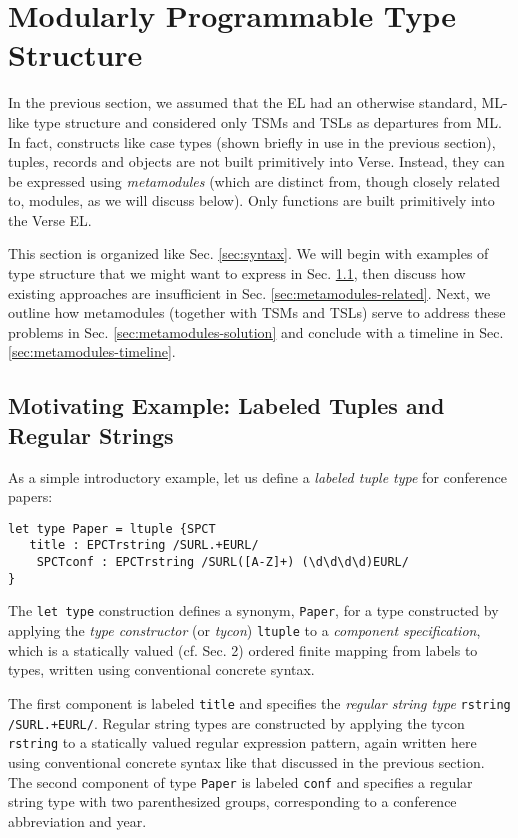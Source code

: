
\section{Modularly Programmable Type Structure}\label{sec:metamodules}
In the previous section, we assumed that the EL had an otherwise standard, ML-like type structure and considered only TSMs and TSLs as departures from ML. In fact, constructs like case types (shown briefly in use in the previous section), tuples, records and objects are not built primitively into Verse. Instead, they can be expressed using \emph{metamodules} (which are distinct from, though closely related to, {modules}, as we will discuss below). Only  functions are built primitively into the Verse EL.

This section is organized like Sec. \ref{sec:syntax}. We will begin with examples of type structure that we might want to express in Sec. \ref{sec:metamodules-example}, then discuss how existing approaches are insufficient in Sec. \ref{sec:metamodules-related}. Next, we outline how {metamodules} (together with TSMs and TSLs) serve to address these problems in Sec. \ref{sec:metamodules-solution} and conclude with a timeline in Sec. \ref{sec:metamodules-timeline}.

\subsection{Motivating Example: Labeled Tuples and Regular Strings}\label{sec:metamodules-example}
As a simple introductory example, let us define a \emph{labeled tuple type} for conference papers:
\begin{lstlisting}[numbers=none]
let type Paper = ltuple {SPCT
   title : EPCTrstring /SURL.+EURL/
    SPCTconf : EPCTrstring /SURL([A-Z]+) (\d\d\d\d)EURL/
}
\end{lstlisting}
The \lstinline{let type} construction defines a synonym, \lstinline{Paper}, for a type constructed by applying the \emph{type constructor} (or \emph{tycon}) \lstinline{ltuple} to a \emph{component specification}, which is a  statically valued (cf. Sec. 2) ordered finite mapping from labels to types, written using conventional concrete syntax.

The first component is labeled \lstinline{title} and specifies the \emph{regular string type} \lstinline{rstring /SURL.+EURL/}. Regular string types are constructed by applying the tycon \lstinline{rstring} to a statically valued regular expression pattern, again written here using conventional concrete syntax like that discussed in the previous section. The second component of type \lstinline{Paper} is labeled \lstinline{conf} and specifies a regular string type with two {parenthesized groups}, corresponding to a conference abbreviation and year. 

